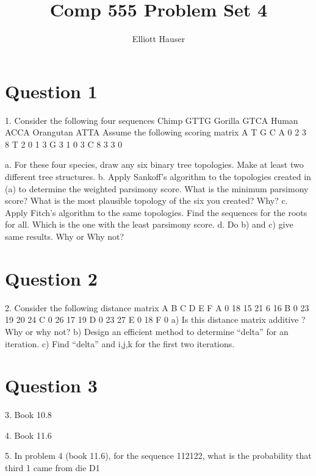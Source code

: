 \documentclass[12pt]{article}
\author{Elliott Hauser}
\title{Comp 555 Problem Set 4}
\begin{document}
\maketitle

\section*{Question 1}
1. Consider the following four sequences 
Chimp GTTG
Gorilla  GTCA
Human  ACCA
Orangutan ATTA
Assume the following scoring matrix
A T G C
A 0 2 3 8
T 2 0 1 3
G 3 1 0 3
C 8 3 3 0

a. For these four species, draw any six binary tree topologies. Make 
at least two different tree structures. 
b. Apply Sankoff’s algorithm to the topologies created in (a) to 
determine the weighted parsimony score. What is the minimum parsimony 
score? What is the most plausible topology of the six you created? 
Why?
c. Apply Fitch’s algorithm to the same topologies. Find the sequences 
for the roots for all. Which is the one with the least parsimony 
score. 
d. Do b) and c) give same results. Why or Why not?

\section*{Question 2}
2. Consider the following distance matrix
A B C D E F
A 0 18 15 21 6 16
B 0 23 19 20 24
C 0 26 17 19
D 0 23 27
E 0 18
F 0
a) Is this distance matrix additive ? Why or why not?
b) Design an efficient method to determine “delta” for an iteration. 
c) Find “delta” and i,j,k for the first two iterations.

\section*{Question 3}
3. Book 10.8


4. Book 11.6


5. In problem 4 (book 11.6), for the sequence 112122, what is the 
probability that third 1 came from die D1
\end{document}
